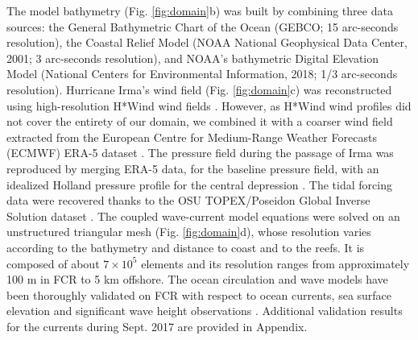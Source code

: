 \documentclass[fleqn,10pt]{wlscirep}
\begin{document}
The model bathymetry (Fig. \ref{fig:domain}b) was built by combining three data sources: the General Bathymetric Chart of the Ocean (GEBCO; 15 arc-seconds resolution), the Coastal Relief Model (NOAA National Geophysical Data Center, 2001; 3 arc-seconds resolution), and NOAA’s bathymetric Digital Elevation Model (National Centers for Environmental Information, 2018; 1/3 arc-seconds resolution). Hurricane Irma's wind field (Fig. \ref{fig:domain}c) was reconstructed using high-resolution H*Wind wind fields \citep{Powell1998Sep}. However, as H*Wind wind profiles did not cover the entirety of our domain, we combined it with a coarser wind field extracted from the European Centre for Medium-Range Weather Forecasts (ECMWF) ERA-5 dataset \citep{Hersbach2020Jul}. The pressure field during the passage of Irma was reproduced by merging ERA-5 data, for the baseline pressure field, with an idealized Holland pressure profile for the central depression \citep{DobbyIrma}. The tidal forcing data were recovered thanks to the OSU TOPEX/Poseidon Global Inverse Solution dataset \citep{Egbert2002Feb}. The coupled wave-current model equations were solved on an unstructured triangular mesh (Fig. \ref{fig:domain}d), whose resolution varies according to the bathymetry and distance to coast and to the reefs. It is composed of about $7 \times 10^5$ elements and its resolution ranges from approximately 100 m in FCR to 5 km offshore. The ocean circulation and wave models have been thoroughly validated on FCR with respect to ocean currents, sea surface elevation and significant wave height observations \citep{Frys2020, DobbyIrma, dobbelaere2022connecting}. Additional validation results for the currents during Sept. 2017 are provided in Appendix.
\end{document}

